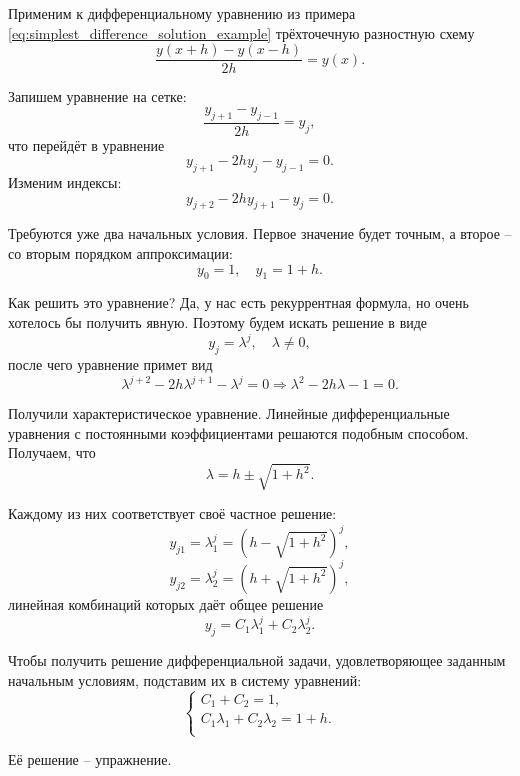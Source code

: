 \documentclass[../main.tex]{subfile}
\begin{document}
\begin{example}
	Применим к дифференциальному уравнению из примера
	\eqref{eq:simplest_difference_solution_example} трёхточечную
	разностную схему
	\[\frac{y(x+h)-y(x-h)}{2h}=y(x).\]

	Запишем уравнение на сетке:
	\[\frac{y_{j+1}-y_{j-1}}{2h}=y_j,\]
	что перейдёт в уравнение
	\[y_{j+1}-2hy_j-y_{j-1}=0.\]
	Изменим индексы:
	\[y_{j+2}-2hy_{j+1}-y_j=0.\]

	Требуются уже два начальных условия. Первое значение будет точным,
	а второе -- со вторым порядком аппроксимации:
	\[y_0=1,\quad y_1=1+h.\]

	Как решить это уравнение? Да, у нас есть рекуррентная формула, но очень
	хотелось бы получить явную. Поэтому будем искать решение в виде
	\[y_j=\lambda^j,\quad\lambda\ne 0,\]
	после чего уравнение примет вид
	\[\lambda^{j+2}-2h\lambda^{j+1}-\lambda^j=0\Rightarrow
	\lambda^2-2h\lambda-1=0.\]

	Получили характеристическое уравнение. Линейные дифференциальные
	уравнения с постоянными коэффициентами решаются подобным способом.
	Получаем, что
	\[\lambda=h\pm\sqrt{1+h^2}.\]

	Каждому из них соответствует своё частное решение:
	\[y_{j1}=\lambda_1^j=(h-\sqrt{1+h^2})^j,\]
	\[y_{j2}=\lambda_2^j=(h+\sqrt{1+h^2})^j,\]
	линейная комбинаций которых даёт общее решение
	\[y_j=C_1\lambda_1^j+C_2\lambda_2^j.\]

	Чтобы получить решение дифференциальной задачи, удовлетворяющее заданным
	начальным условиям, подставим их в систему уравнений:
	\[
	\begin{cases}
		C_1+C_2=1, \\
		C_1\lambda_1+C_2\lambda_2=1+h. \\
	\end{cases}
	\]

	Её решение -- упражнение.
\end{example}
\end{document}
